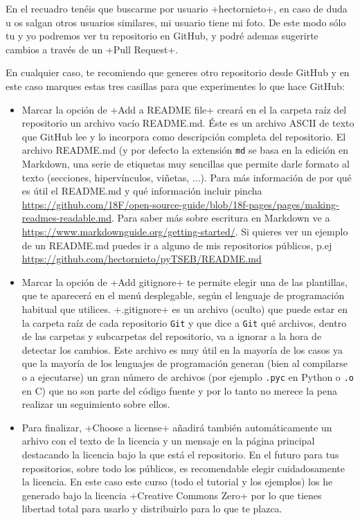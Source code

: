 \documentclass[a4paper,10pt]{article}
\begin{document}
\begin{enumerate}
       En el recuadro tenéis que buscarme por usuario \cverb+hectornieto+, en caso de duda u os salgan otros usuarios similares, mi usuario tiene mi foto. De este modo sólo tu y yo podremos ver tu repositorio en GitHub, y podré ademas sugerirte cambios a través de un \cverb+Pull Request+.
      \end{enumerate}


       
       En cualquier caso, te recomiendo que generes otro repositorio desde GitHub y en este caso marques estas tres casillas para que experimentes lo que hace GitHub:
       
       \begin{itemize}
        \item Marcar la opción de \cverb+Add a README file+ creará en el la carpeta raíz del repositorio un archivo vacío README.md. Éste es un archivo ASCII de texto que GitHub lee y lo incorpora como descripción completa del repositorio. El archivo README.md (y por defecto la extensión \verb+md+ se basa en la edición en Markdown, una serie de etiquetas muy sencillas que permite darle formato al texto (secciones, hipervínculos, viñetas, ...). Para más información de por qué es útil el README.md y qué información incluir pincha \href{aquí}{https://github.com/18F/open-source-guide/blob/18f-pages/pages/making-readmes-readable.md}. Para saber más sobre escritura en Markdown ve a \url{https://www.markdownguide.org/getting-started/}. Si quieres ver un ejemplo de un README.md puedes ir a alguno de mis repositorios públicos, p.ej \url{https://github.com/hectornieto/pyTSEB/README.md}
       
        \item Marcar la opción de \cverb+Add gitignore+ te permite elegir una de las plantillas, que te aparecerá en el menú desplegable, según el lenguaje de programación habitual que utilices. \cverb+.gitignore+ es un archivo (oculto) que puede estar en la carpeta raíz de cada repositorio \verb+Git+ y que dice a \verb+Git+ qué archivos, dentro de las carpetas y subcarpetas del repositorio, va a ignorar a la hora de detectar los cambios. Este archivo es muy útil en la mayoría de los casos ya que la mayoría de los lenguajes de programación generan (bien al compilarse o a ejecutarse) un gran número de archivos (por ejemplo \verb+.pyc+ en Python o \verb+.o+ en C) que no son parte del código fuente y por lo tanto no merece la pena realizar un seguimiento sobre ellos.
       
        \item Para finalizar, \cverb+Choose a license+  añadirá   también automáticamente un arhivo con el texto de la licencia y un mensaje en la página principal destacando la licencia bajo la que está el repositorio. En el futuro para tus repositorios, sobre todo los públicos, es recomendable elegir cuidadosamente la licencia. En este caso este curso (todo el tutorial y los ejemplos) los he generado bajo la licencia \cverb+Creative Commons Zero+ por lo que tienes libertad total para usarlo y distribuirlo para lo que te plazca.
       

\end{itemize}
\end{document}
